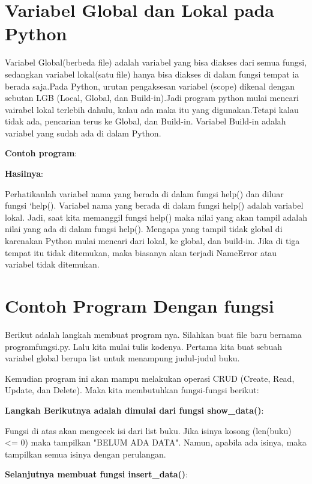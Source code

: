 \section{Variabel Global dan Lokal pada Python}
\par Variabel Global(berbeda file) adalah variabel yang bisa diakses dari semua fungsi, sedangkan variabel lokal(satu file) hanya bisa diakses di dalam fungsi tempat ia berada saja.Pada Python, urutan pengaksesan variabel (scope) dikenal dengan sebutan LGB (Local, Global, dan Build-in).Jadi program python mulai mencari vairabel lokal terlebih dahulu, kalau ada maka itu yang digunakan.Tetapi kalau tidak ada, pencarian terus ke Global, dan Build-in. Variabel Build-in adalah variabel yang sudah ada di dalam Python.
\par\textbf{Contoh program}:

\par \textbf{Hasilnya}:

\newpage Perhatikanlah variabel nama yang berada di dalam fungsi help() dan diluar fungsi `help(). Variabel nama yang berada di dalam fungsi help() adalah variabel lokal. Jadi, saat kita memanggil fungsi help() maka nilai yang akan tampil adalah nilai yang ada di dalam fungsi help(). Mengapa yang tampil tidak global di karenakan Python mulai mencari dari lokal, ke global, dan build-in. Jika di tiga tempat itu tidak ditemukan, maka biasanya akan terjadi NameError atau variabel tidak ditemukan.

\section{Contoh Program Dengan fungsi}
Berikut adalah langkah membuat program nya. Silahkan buat file baru bernama programfungsi.py. Lalu kita mulai tulis kodenya. Pertama kita buat sebuah variabel global berupa list untuk menampung judul-judul buku.

Kemudian program ini akan mampu melakukan operasi CRUD (Create, Read, Update, dan Delete). Maka kita membutuhkan fungsi-fungsi berikut:

\par \textbf{Langkah Berikutnya adalah dimulai dari fungsi show\_data()}:

Fungsi di atas akan mengecek isi dari list buku. Jika isinya kosong (len(buku) <= 0) maka tampilkan "BELUM ADA DATA". Namun, apabila ada isinya, maka tampilkan semua isinya dengan perulangan.
\par\textbf{Selanjutnya membuat fungsi insert\_data()}:

